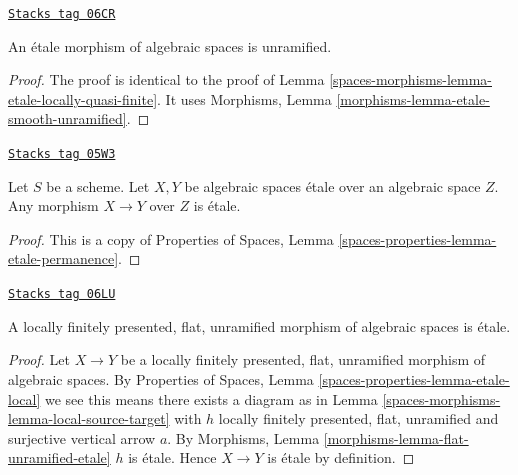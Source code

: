 \begin{lemma}
\label{spaces-morphisms-lemma-etale-unramified}
\href{https://stacks.math.columbia.edu/tag/06CR}{\texttt{Stacks tag 06CR}}

An \'etale morphism of algebraic spaces is unramified.
\end{lemma}

\begin{proof}
The proof is identical to the proof of
Lemma \ref{spaces-morphisms-lemma-etale-locally-quasi-finite}.
It uses
Morphisms, Lemma \ref{morphisms-lemma-etale-smooth-unramified}.
\end{proof}

\begin{lemma}
\label{spaces-morphisms-lemma-etale-permanence}
\href{https://stacks.math.columbia.edu/tag/05W3}{\texttt{Stacks tag 05W3}}

Let $S$ be a scheme. Let $X, Y$ be algebraic spaces \'etale over
an algebraic space $Z$. Any morphism $X \to Y$ over $Z$ is \'etale.
\end{lemma}

\begin{proof}
This is a copy of
Properties of Spaces, Lemma \ref{spaces-properties-lemma-etale-permanence}.
\end{proof}

\begin{lemma}
\label{spaces-morphisms-lemma-unramified-flat-lfp-etale}
\href{https://stacks.math.columbia.edu/tag/06LU}{\texttt{Stacks tag 06LU}}

A locally finitely presented, flat, unramified morphism of algebraic
spaces is \'etale.
\end{lemma}

\begin{proof}
Let $X \to Y$ be a locally finitely presented, flat, unramified morphism
of algebraic spaces. By
Properties of Spaces, Lemma \ref{spaces-properties-lemma-etale-local}
we see this means there exists a diagram as in
Lemma \ref{spaces-morphisms-lemma-local-source-target}
with $h$ locally finitely presented, flat, unramified
and surjective vertical arrow $a$. By
Morphisms, Lemma \ref{morphisms-lemma-flat-unramified-etale}
$h$ is \'etale. Hence $X \to Y$ is \'etale by definition.
\end{proof}

